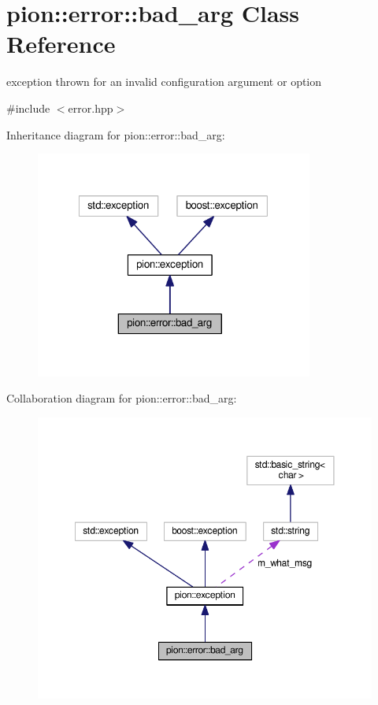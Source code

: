 \hypertarget{classpion_1_1error_1_1bad__arg}{\section{pion\-:\-:error\-:\-:bad\-\_\-arg Class Reference}
\label{classpion_1_1error_1_1bad__arg}
}


exception thrown for an invalid configuration argument or option  




{\ttfamily \#include $<$error.\-hpp$>$}



Inheritance diagram for pion\-:\-:error\-:\-:bad\-\_\-arg\-:
\nopagebreak
\begin{figure}[H]
\begin{center}
\leavevmode
\includegraphics[width=259pt]{classpion_1_1error_1_1bad__arg__inherit__graph}
\end{center}
\end{figure}


Collaboration diagram for pion\-:\-:error\-:\-:bad\-\_\-arg\-:
\nopagebreak
\begin{figure}[H]
\begin{center}
\leavevmode
\includegraphics[width=350pt]{classpion_1_1error_1_1bad__arg__coll__graph}
\end{center}
\end{figure}
